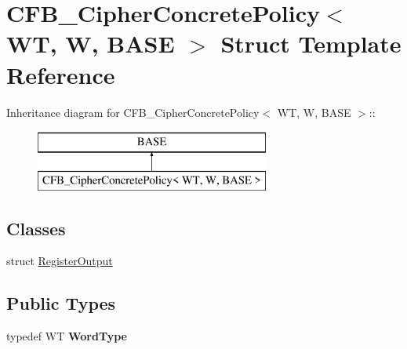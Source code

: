 \hypertarget{struct_c_f_b___cipher_concrete_policy}{
\section{CFB\_\-CipherConcretePolicy$<$ WT, W, BASE $>$ Struct Template Reference}
\label{struct_c_f_b___cipher_concrete_policy}
}
Inheritance diagram for CFB\_\-CipherConcretePolicy$<$ WT, W, BASE $>$::\begin{figure}[H]
\begin{center}
\leavevmode
\includegraphics[height=2cm]{struct_c_f_b___cipher_concrete_policy}
\end{center}
\end{figure}
\subsection*{Classes}
\begin{DoxyCompactItemize}
\item 
struct \hyperlink{struct_c_f_b___cipher_concrete_policy_1_1_register_output}{RegisterOutput}
\end{DoxyCompactItemize}
\subsection*{Public Types}
\begin{DoxyCompactItemize}
\item 
\hypertarget{struct_c_f_b___cipher_concrete_policy_ad2553cceef6af4437f6930ec3af95bf7}{
typedef WT {\bfseries WordType}}
\label{struct_c_f_b___cipher_concrete_policy_ad2553cceef6af4437f6930ec3af95bf7}

\end{DoxyCompactItemize}
